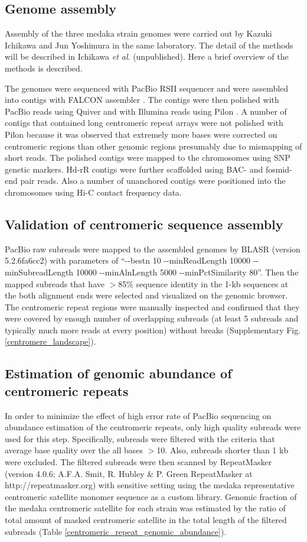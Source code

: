 \subsection*{Genome assembly}
  Assembly of the three medaka strain genomes were carried out by Kazuki Ichikawa and Jun Yoshimura in the same laboratory. The detail of the methods will be described in Ichikawa \textit{et al}. (unpublished). Here a brief overview of the methods is described.

  The genomes were sequenced with PacBio RSII sequencer and were assembled into contigs with FALCON assembler \cite{Chin2016}. The contigs were then polished with PacBio reads using Quiver \cite{Chin2013} and with Illumina reads using Pilon \cite{Walker2014}. A number of contigs that contained long centromeric repeat arrays were not polished with Pilon because it was observed that extremely more bases were corrected on centromeric regions than other genomic regions presumably due to mismapping of short reads. The polished contigs were mapped to the chromosomes using SNP genetic markers. Hd-rR contigs were further scaffolded using BAC- and fosmid-end pair reads. Also a number of unanchored contigs were positioned into the chromosomes using Hi-C contact frequency data.


\subsection*{Validation of centromeric sequence assembly}
  PacBio raw subreads were mapped to the assembled genomes by BLASR (version 5.2.6fa6cc2) \cite{Chaisson2012} with parameters of ``{-}{-}bestn 10 {-}{-}minReadLength 10000 {-}{-}minSubreadLength 10000 {-}{-}minAlnLength 5000 {-}{-}minPctSimilarity 80''. Then the mapped subreads that have $>$85\% sequence identity in the 1-kb sequences at the both alignment ends were selected and visualized on the genomic browser. The centromeric repeat regions were manually inspected and confirmed that they were covered by enough number of overlapping subreads (at least 5 subreads and typically much more reads at every position) without breaks (Supplementary Fig. \ref{centromere_landscape}).


\subsection*{Estimation of genomic abundance of centromeric repeats}
  In order to minimize the effect of high error rate of PacBio sequencing on abundance estimation of the centromeric repeats, only high quality subreads were used for this step. Specifically, subreads were filtered with the criteria that average base quality over the all bases $>$10. Also, subreads shorter than 1 kb were excluded. The filtered subreads were then scanned by RepeatMasker (version 4.0.6; A.F.A. Smit, R. Hubley \& P. Green RepeatMasker at http://repeatmasker.org) with sensitive setting using the medaka representative centromeric satellite monomer sequence as a custom library. Genomic fraction of the medaka centromeric satellite for each strain was estimated by the ratio of total amount of masked centromeric satellite in the total length of the filtered subreads (Table \ref{centromeric_repeat_genomic_abundance}).



